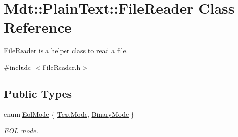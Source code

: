 \hypertarget{class_mdt_1_1_plain_text_1_1_file_reader}{}\section{Mdt\+:\+:Plain\+Text\+:\+:File\+Reader Class Reference}
\label{class_mdt_1_1_plain_text_1_1_file_reader}


\hyperlink{class_mdt_1_1_plain_text_1_1_file_reader}{File\+Reader} is a helper class to read a file.  




{\ttfamily \#include $<$File\+Reader.\+h$>$}

\subsection*{Public Types}
\begin{DoxyCompactItemize}
\item 
enum \hyperlink{class_mdt_1_1_plain_text_1_1_file_reader_ad9b4b7e046f899c9d13e19434d68ef10}{Eol\+Mode} \{ \hyperlink{class_mdt_1_1_plain_text_1_1_file_reader_ad9b4b7e046f899c9d13e19434d68ef10a80c0cede59c86d5daac618c3efd559cd}{Text\+Mode}, 
\hyperlink{class_mdt_1_1_plain_text_1_1_file_reader_ad9b4b7e046f899c9d13e19434d68ef10a2f9465e5839be39706f7a1e65db20aee}{Binary\+Mode}
 \}\begin{DoxyCompactList}\small\item\em E\+OL mode. \end{DoxyCompactList}
\end{DoxyCompactItemize}
